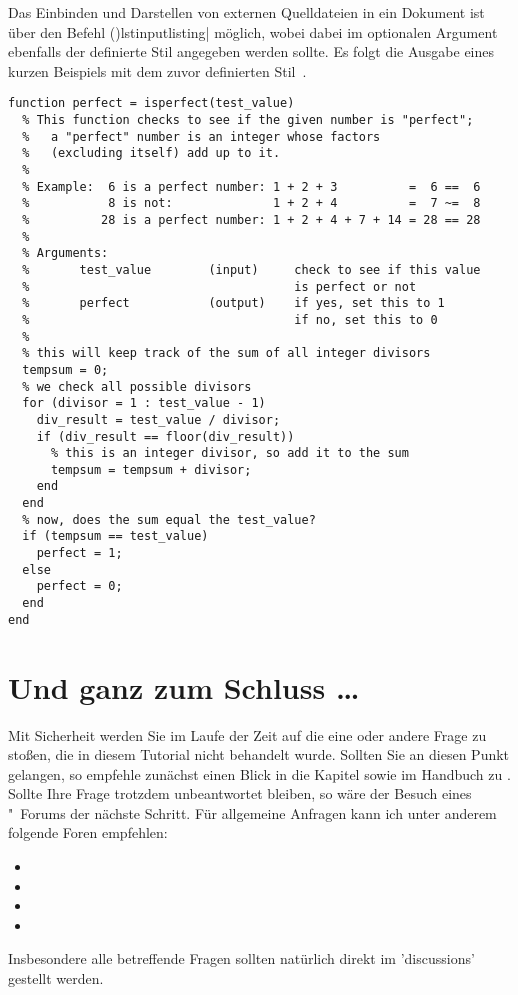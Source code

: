 \documentclass[%
  english,ngerman,%
  cdgeometry=no,DIV=12,%
  cd=false,cdfont=false,cdtitle=true,%
  headings=normal,%
  automark,%
  listof=toc,%
]{tudscrartcl}
\begin{document}
Das Einbinden und Darstellen von externen Quelldateien in ein Dokument ist über 
den Befehl
\Macro(){lstinputlisting|\OList{}} 
möglich, wobei dabei im optionalen Argument ebenfalls der definierte Stil 
angegeben werden sollte. Es folgt die Ausgabe eines kurzen Beispiels mit dem 
zuvor definierten Stil~.
%
\begin{lstlisting}[style=matlab]
function perfect = isperfect(test_value)
  % This function checks to see if the given number is "perfect";
  %   a "perfect" number is an integer whose factors 
  %   (excluding itself) add up to it.
  %
  % Example:  6 is a perfect number: 1 + 2 + 3          =  6 ==  6
  %           8 is not:              1 + 2 + 4          =  7 ~=  8
  %          28 is a perfect number: 1 + 2 + 4 + 7 + 14 = 28 == 28
  %
  % Arguments:
  %       test_value        (input)     check to see if this value 
  %                                     is perfect or not
  %       perfect           (output)    if yes, set this to 1
  %                                     if no, set this to 0
  %
  % this will keep track of the sum of all integer divisors
  tempsum = 0;
  % we check all possible divisors
  for (divisor = 1 : test_value - 1)
    div_result = test_value / divisor;
    if (div_result == floor(div_result)) 
      % this is an integer divisor, so add it to the sum
      tempsum = tempsum + divisor;
    end
  end
  % now, does the sum equal the test_value?
  if (tempsum == test_value) 
    perfect = 1;
  else
    perfect = 0;
  end
end
\end{lstlisting}



\section{Und ganz zum Schluss \dots}

Mit Sicherheit werden Sie im Laufe der Zeit auf die eine oder andere Frage zu 
 stoßen, die in diesem Tutorial nicht behandelt wurde. Sollten 
Sie an diesen Punkt gelangen, so empfehle zunächst einen Blick in die Kapitel 
sowie  im Handbuch zu 
\TUDScript. Sollte Ihre Frage trotzdem unbeantwortet bleiben, so wäre der 
Besuch eines "~Forums der nächste Schritt. Für allgemeine 
Anfragen kann ich unter anderem folgende Foren empfehlen:
%
\begin{itemize}
\item {}
\item {}
\item {}
\item {}
\end{itemize} 
%
Insbesondere alle \TUDScript betreffende Fragen sollten natürlich direkt im 
\GitHubRepo'discussions' gestellt werden.
\end{document}

